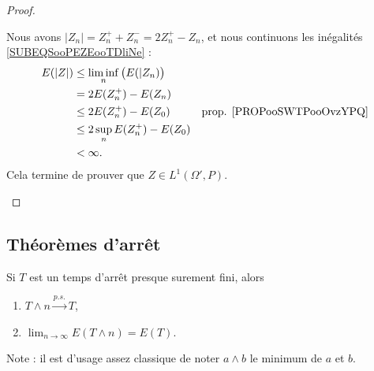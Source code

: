 \begin{proof}
\begin{subproof}
		Nous avons \( | Z_n |=Z_n^++Z_n^-=2Z_n^+-Z_n\), et nous continuons les inégalités \eqref{SUBEQSooPEZEooTDliNe} :
		\begin{subequations}
			\begin{align}
				E(| Z |) & \leq \liminf_{n}\big( E(|Z_n) \big)                                         \\
				         & =2E(Z_n^+)-E(Z_n)                                                           \\
				         & \leq 2E(Z_n^+)-E(Z_0)               & \text{prop. \ref{PROPooSWTPooOvzYPQ}} \\
				         & \leq 2\sup_nE(Z_n^+)-E(Z_0)                                                 \\
				         & <\infty.
			\end{align}
		\end{subequations}
		Cela termine de prouver que \( Z\in L^1(\Omega',P)\).
	\end{subproof}
\end{proof}

\subsection{Théorèmes d'arrêt}


\begin{lemma} \label{LemXYeCLXW}
	Si \( T\) est un temps d'arrêt presque surement fini, alors
	\begin{enumerate}
		\item \( T\wedge n\stackrel{p.s.}{\longrightarrow}T\),
		\item   \label{ItemIPPkxmAii}
		      \( \lim_{n\to \infty}  E(T\wedge n)=E(T)\).
	\end{enumerate}
	Note : il est d'usage assez classique de noter \( a\wedge b\) le minimum de \( a\) et \( b\).
\end{lemma}

